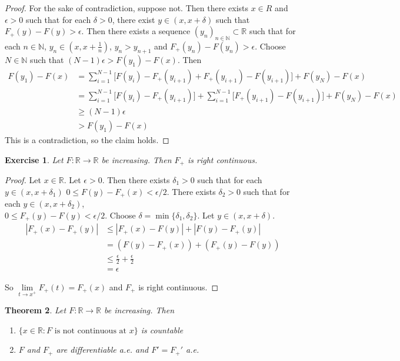 \documentclass[12pt]{amsart}
\newtheorem{thm}{Theorem}[subsection]
\newtheorem{ex}[thm]{Exercise}
\newcommand{\del}{\delta}
\newcommand{\ep}{\epsilon}
\newcommand{\N}{\mathbb{N}}
\newcommand{\R}{\mathbb{R}}
\begin{document}
\begin{proof}
	For the sake of contradiction, suppose not. Then there exists $x \in R$ and $\ep >0$ such that for each $\del >0$, there exist $y \in (x,x+\del)$ such that $F_+(y) - F(y) > \ep$. Then there exists a sequence $(y_n)_{n \in \N} \subset \R$ such that for each $n \in \N$, $y_n \in (x, x+\frac{1}{n})$, $y_n > y_{n+1}$ and $F_+(y_n) - F(y_n) > \ep$. Choose $N \in \N$ such that $(N-1)\ep > F(y_1) - F(x)$. Then 
	\begin{align*}
		F(y_1) - F(x) 
		&= \sum_{i=1}^{N-1} \bigg[F(y_i)-F_+(y_{i+1}) + F_+(y_{i+1}) - F(y_{i+1}) \bigg] + F(y_N)- F(x)\\
		& = \sum_{i=1}^{N-1} \bigg[F(y_i)-F_+(y_{i+1}) \bigg] + \sum_{i=1}^{N-1} \bigg[ F_+(y_{i+1}) - F(y_{i+1}) \bigg] + F(y_N)- F(x) \\
		& \geq (N-1)\ep \\
		& > F(y_1) - F(x)
	\end{align*}
	This is a contradiction, so the claim holds.
\end{proof}

\begin{ex}
	Let $F:\R \rightarrow \R$ be increasing. Then $F_+$ is right continuous. 
\end{ex}

\begin{proof}
	Let $x \in \R$. Let $\ep >0$. Then there exists $\del_1>0$ such that for each $y \in (x,x+\del_1)$ $0 \leq F(y)-F_+(x) < \ep/2$. There exists $\del_2 >0$ such that for each $y \in (x,x+\del_2)$, \\$0 \leq F_+(y)-F(y) < \ep/2$. Choose $\del = \min\{\del_1, \del_2\}$. Let $y \in (x, x+\del)$.
	\begin{align*}
		|F_+(x) - F_+(y)|
		& \leq |F_+(x) - F(y)| + |F(y)- F_+(y)| \\
		& = (F(y) - F_+(x)) + (F_+(y) - F(y)) \\
		& \leq \frac{\ep}{2} + \frac{\ep}{2}\\
		& = \ep
	\end{align*}
	
	So $\lim\limits_{t \rightarrow x^+} F_+(t) = F_+(x)$ and $F_+$ is right continuous.
\end{proof}

\begin{thm}
	Let $F:\R \rightarrow \R$ be increasing. Then 
	\begin{enumerate}
		\item $\{x \in \R: F \text{ is not continuous at }x\}$ is countable
		\item $F$ and $F_+$ are differentiable a.e. and $F' = F_+'$ a.e.
	\end{enumerate}
\end{thm}
\end{document}
